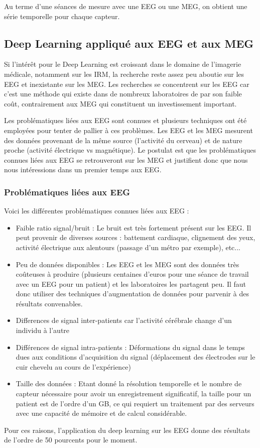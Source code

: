 \documentclass[10pt,twocolumn,letterpaper]{article}
\begin{document}
Au terme d'une séances de mesure avec une EEG ou une MEG, on obtient une série temporelle pour chaque capteur.

\subsection{Deep Learning appliqué aux EEG et aux MEG}

Si l'intérêt pour le Deep Learning est croissant dans le domaine de l'imagerie médicale, notamment sur les IRM, la recherche reste assez peu aboutie sur les EEG et inexistante sur les MEG. Les recherches se concentrent sur les EEG car c'est une méthode qui existe dans de nombreux laboratoires de par son faible coût, contrairement aux MEG qui constituent un investissement important.

Les problématiques liées aux EEG sont connues et plusieurs techniques ont été employées pour tenter de pallier à ces problèmes. Les EEG et les MEG mesurent des données provenant de la même source (l'activité du cerveau) et de nature proche (activité électrique vs magnétique). Le postulat est que les problématiques connues liées aux EEG se retrouveront sur les MEG et justifient donc que nous nous intéressions dans un premier temps aux EEG.

\subsubsection{Problématiques liées aux EEG}
Voici les différentes problématiques connues liées aux EEG :

\begin{itemize}
	\item Faible ratio signal/bruit : Le bruit est très fortement présent sur les EEG. Il peut provenir de diverses sources : battement cardiaque, clignement des yeux, activité électrique aux alentours (passage d'un métro par exemple), etc...
	\item Peu de données disponibles : Les EEG et les MEG sont des données très coûteuses à produire (plusieurs centaines d'euros pour une séance de travail avec un EEG pour un patient) et les laboratoires les partagent peu. Il faut donc utiliser des techniques d'augmentation de données pour parvenir à des résultats convenables.
	\item Differences de signal inter-patients car l'activité cérébrale change d'un individu à l'autre
	\item Différences de signal intra-patients : Déformations du signal dans le temps dues aux conditions d'acquisition du signal (déplacement des électrodes sur le cuir chevelu au cours de l'expérience)
	\item Taille des données : Etant donné la résolution temporelle et le nombre de capteur nécessaire pour avoir un enregistrement significatif, la taille pour un patient est de l'ordre d'un GB, ce qui requiert un traitement par des serveurs avec une capacité de mémoire et de calcul considérable.

\end{itemize}
Pour ces raisons, l'application du deep learning sur les EEG donne des résultats de l'ordre de 50 pourcents pour le moment.
\end{document}
